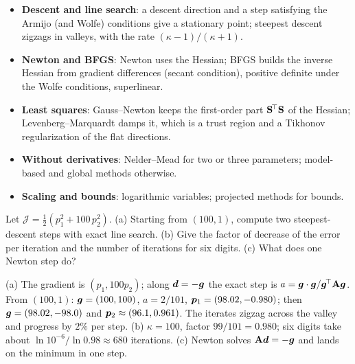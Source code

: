 \begin{gbox*}
\begin{itemize}
  \item \textbf{Descent and line search}: a descent direction and a step satisfying
  the Armijo (and Wolfe) conditions give a stationary point; steepest descent
  zigzags in valleys, with the rate $(\kappa-1)/(\kappa+1)$.
  \item \textbf{Newton and BFGS}: Newton uses the Hessian; BFGS builds the inverse
  Hessian from gradient differences (secant condition), positive definite under
  the Wolfe conditions, superlinear.
  \item \textbf{Least squares}: Gauss--Newton keeps the first-order part
  $\mathbf{S}^{\!\top}\mathbf{S}$ of the Hessian; Levenberg--Marquardt damps it, which is a trust
  region and a Tikhonov regularization of the flat directions.
  \item \textbf{Without derivatives}: Nelder--Mead for two or three parameters;
  model-based and global methods otherwise.
  \item \textbf{Scaling and bounds}: logarithmic variables; projected methods for
  bounds.
\end{itemize}
\end{gbox*}


\label{exo:opt-sd}
%
Let $\mathcal J=\tfrac12(p_1^2+100\,p_2^2)$. (a) Starting from $(100,1)$, compute two
steepest-descent steps with exact line search. (b) Give the factor of decrease of
the error per iteration and the number of iterations for six digits. (c) What does
one Newton step do?
\begin{solution}
(a) The gradient is $(p_1,100p_2)$; along $\bm{d}=-\bm{g}$ the exact step is
$a=\bm{g}\cdot\bm{g}/\bm{g}^{\!\top}\mathbf{A}\bm{g}$. From $(100,1)$: $\bm{g}=(100,100)$,
$a=2/101$, $\bm{p}_1=(98.02,-0.980)$; then $\bm{g}=(98.02,-98.0)$ and
$\bm{p}_2\approx(96.1,0.961)$. The iterates zigzag across the valley and progress
by $2\%$ per step. (b) $\kappa=100$, factor $99/101=0.980$; six digits take about
$\ln10^{-6}/\ln0.98\approx680$ iterations. (c) Newton solves
$\mathbf{A}\bm{d}=-\bm{g}$ and lands on the minimum in one step.
\end{solution}


